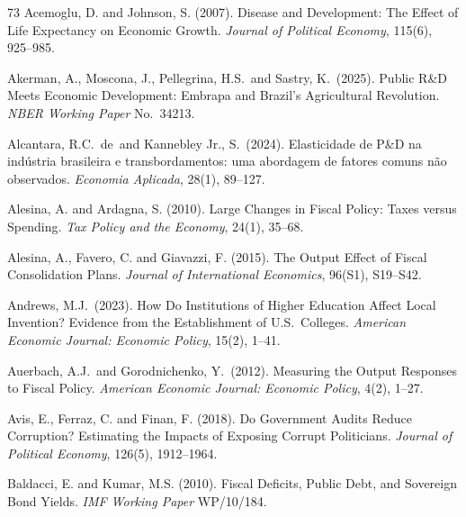 \documentclass[11pt,a4paper]{article}
\begin{document}

\begin{thebibliography}{73}
 Acemoglu, D. and Johnson, S. (2007). Disease and Development: The Effect of Life Expectancy on Economic Growth. \textit{Journal of Political Economy}, 115(6), 925--985.

 Akerman, A., Moscona, J., Pellegrina, H.S.\ and Sastry, K.\ (2025). Public R\&D Meets Economic Development: Embrapa and Brazil's Agricultural Revolution. \textit{NBER Working Paper} No.\ 34213.

 Alcantara, R.C.\ de\ and Kannebley Jr., S.\ (2024). Elasticidade de P\&D na ind\'ustria brasileira e transbordamentos: uma abordagem de fatores comuns n\~ao observados. \textit{Economia Aplicada}, 28(1), 89--127.

 Alesina, A. and Ardagna, S. (2010). Large Changes in Fiscal Policy: Taxes versus Spending. \textit{Tax Policy and the Economy}, 24(1), 35--68.

 Alesina, A., Favero, C. and Giavazzi, F. (2015). The Output Effect of Fiscal Consolidation Plans. \textit{Journal of International Economics}, 96(S1), S19--S42.

 Andrews, M.J.\ (2023). How Do Institutions of Higher Education Affect Local Invention? Evidence from the Establishment of U.S.\ Colleges. \textit{American Economic Journal: Economic Policy}, 15(2), 1--41.

 Auerbach, A.J.\ and Gorodnichenko, Y.\ (2012). Measuring the Output Responses to Fiscal Policy. \textit{American Economic Journal: Economic Policy}, 4(2), 1--27.

 Avis, E., Ferraz, C. and Finan, F. (2018). Do Government Audits Reduce Corruption? Estimating the Impacts of Exposing Corrupt Politicians. \textit{Journal of Political Economy}, 126(5), 1912--1964.

 Baldacci, E. and Kumar, M.S. (2010). Fiscal Deficits, Public Debt, and Sovereign Bond Yields. \textit{IMF Working Paper} WP/10/184.


\end{thebibliography}
\end{document}
